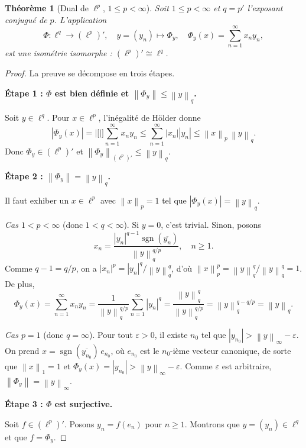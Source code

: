 \documentclass[a4paper,12pt]{book}
\DeclareMathOperator{\sgn}{sgn}
\newcommand{\norm}[1]{\left\| #1 \right\|}
\newcommand{\abs}[1]{\left| #1 \right|}
\theoremstyle{definition}
\theoremstyle{plain}
\newtheorem{theoreme}[definition]{Théorème}
\theoremstyle{remark}
\begin{document}
\begin{theoreme}[{Dual de $\ell^p$, $1 \le p < \infty$}]
\label{thm:dual-lp}
Soit $1 \le p < \infty$ et $q = p'$ l'exposant conjugué de $p$.
L'application
\[
  \Phi : \ell^q \longrightarrow (\ell^p)', \quad
  y = (y_n) \longmapsto \Phi_y, \quad
  \Phi_y(x) = \sum_{n=1}^{\infty} x_n y_n,
\]
est une isométrie isomorphe : $(\ell^p)' \cong \ell^q$.
\end{theoreme}

\begin{proof}
La preuve se décompose en trois étapes.

\medskip
\noindent\textbf{Étape 1 : $\Phi$ est bien définie et $\norm{\Phi_y} \le \norm{y}_q$.}

Soit $y \in \ell^q$. Pour $x \in \ell^p$, l'inégalité de Hölder donne
\[
  \abs{\Phi_y(x)} = \abs[\bigg]{\sum_{n=1}^{\infty} x_n y_n}
  \le \sum_{n=1}^{\infty} \abs{x_n} \abs{y_n}
  \le \norm{x}_p \, \norm{y}_q.
\]
Donc $\Phi_y \in (\ell^p)'$ et $\norm{\Phi_y}_{(\ell^p)'} \le \norm{y}_q$.

\medskip
\noindent\textbf{Étape 2 : $\norm{\Phi_y} = \norm{y}_q$.}

Il faut exhiber un $x \in \ell^p$ avec $\norm{x}_p = 1$ tel que
$\abs{\Phi_y(x)} = \norm{y}_q$.

\emph{Cas $1 < p < \infty$} (donc $1 < q < \infty$). Si $y = 0$, c'est trivial.
Sinon, posons
\[
  x_n = \frac{\abs{y_n}^{q-1} \sgn(\overline{y_n})}{\norm{y}_q^{q/p}},
  \quad n \ge 1.
\]
Comme $q - 1 = q/p$, on a $\abs{x_n}^p = \abs{y_n}^q / \norm{y}_q^q$, d'où
$\norm{x}_p^p = \norm{y}_q^q / \norm{y}_q^q = 1$. De plus,
\[
  \Phi_y(x) = \sum_{n=1}^{\infty} x_n y_n
  = \frac{1}{\norm{y}_q^{q/p}} \sum_{n=1}^{\infty} \abs{y_n}^q
  = \frac{\norm{y}_q^q}{\norm{y}_q^{q/p}} = \norm{y}_q^{q - q/p} = \norm{y}_q.
\]

\emph{Cas $p = 1$} (donc $q = \infty$). Pour tout $\varepsilon > 0$, il existe $n_0$
tel que $\abs{y_{n_0}} > \norm{y}_\infty - \varepsilon$. On prend $x = \sgn(\overline{y_{n_0}}) \, e_{n_0}$,
où $e_{n_0}$ est le $n_0$-ième vecteur canonique, de sorte
que $\norm{x}_1 = 1$ et $\Phi_y(x) = \abs{y_{n_0}} > \norm{y}_\infty - \varepsilon$.
Comme $\varepsilon$ est arbitraire, $\norm{\Phi_y} = \norm{y}_\infty$.

\medskip
\noindent\textbf{Étape 3 : $\Phi$ est surjective.}

Soit $f \in (\ell^p)'$. Posons $y_n = f(e_n)$ pour $n \ge 1$.
Montrons que $y = (y_n) \in \ell^q$ et que $f = \Phi_y$.


\end{proof}
\end{document}
